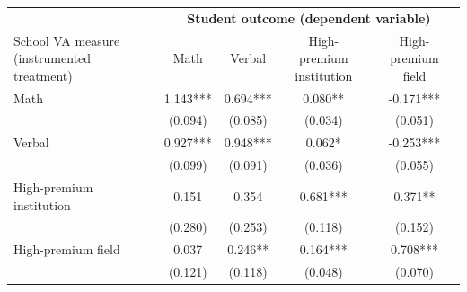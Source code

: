 \begin{tabular}{lcccc}
\toprule
& \multicolumn{4}{c}{\textbf{Student outcome (dependent variable)}} \\
\cmidrule(lr){2-5}
\shortstack[l]{School VA measure\\(instrumented treatment)} & Math & Verbal & \shortstack{High-premium\\institution} & \shortstack{High-premium\\field} \\
\midrule
Math & 1.143*** & 0.694*** & 0.080** & -0.171*** \\
 & (0.094) & (0.085) & (0.034) & (0.051) \\
Verbal & 0.927*** & 0.948*** & 0.062* & -0.253*** \\
 & (0.099) & (0.091) & (0.036) & (0.055) \\
High-premium institution & 0.151 & 0.354 & 0.681*** & 0.371** \\
 & (0.280) & (0.253) & (0.118) & (0.152) \\
High-premium field & 0.037 & 0.246** & 0.164*** & 0.708*** \\
 & (0.121) & (0.118) & (0.048) & (0.070) \\
\bottomrule
\end{tabular}
